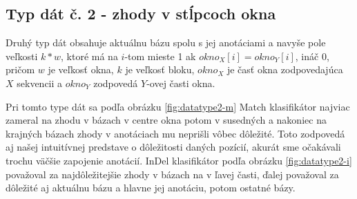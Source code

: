 
\subsection{Typ dát č. 2 - zhody v stĺpcoch okna}
\label{subsec:datatype2}

Druhý typ dát obsahuje aktuálnu bázu spolu s jej anotáciami a navyše pole veľkosti $k*w$, ktoré má na $i$-tom mieste 1 ak $okno_X[i] = okno_Y[i]$, ináč 0, pričom $w$ je veľkosť okna, $k$ je veľkosť bloku, $okno_X$ je časť okna zodpovedajúca $X$ sekvencii a $okno_Y$ zodpovedá $Y$-ovej časti okna.

Pri tomto type dát sa podľa obrázku \ref{fig:datatype2-m} Match klasifikátor najviac zameral na zhodu v bázach v centre okna potom v susedných a nakoniec na krajných bázach zhody v anotáciach mu neprišli vôbec dôležité.
Toto zodpovedá aj našej intuitívnej predstave o dôležitosti daných pozícií, akurát sme očakávali trochu väčšie zapojenie anotácií.
InDel klasifikátor podľa obrázku \ref{fig:datatype2-i} považoval za najdôležitejšie zhody v bázach na v ľavej časti, ďalej považoval za dôležité aj aktuálnu bázu a hlavne jej anotáciu, potom ostatné bázy.


